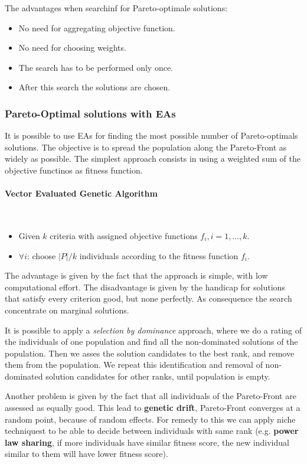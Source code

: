 \documentclass{article}
\begin{document}
The advantages when searchinf for Pareto-optimale solutions:
\begin{itemize}
    \item No need for aggregating objective function.
    \item No need for choosing weights.
    \item The search has to be performed only once.
    \item After this search the solutions are chosen.
\end{itemize}

\subsubsection{Pareto-Optimal solutions with EAs}
It is possible to use EAs for finding the most possible number of Pareto-optimals solutions.
The objective is to spread the population along the Pareto-Front as widely as possible. The
simplest approach consists in using a weighted sum of the objective functinos as fitness function.

\paragraph{Vector Evaluated Genetic Algorithm}\mbox{}\\
\begin{itemize}
    \item Given $k$ criteria with assigned objective functions $f_i, i=1,\dots,k$.
    \item $\forall i$: choose $|P|/k$ individuals according to the fitness function $f_i$.
\end{itemize}
The advantage is given by the fact that the approach is simple, with low computational effort.
The disadvantage is given by the handicap for solutions that satisfy every criterion good,
but none perfectly. As consequence the search concentrate on marginal solutions.

It is possible to apply a \textit{selection by dominance} approach, where we do a rating of the
individuals of one population and find all the non-dominated solutions of the population. Then
we asses the solution candidates to the best rank, and remove them from the population.
We repeat this identification and removal of non-dominated solution candidates for other ranks,
until population is empty.

Another problem is given by the fact that all individuals of the Pareto-Front are assessed as equally
good. This lead to \textbf{genetic drift}, Pareto-Front converges at a random point, because
of random effects. For remedy to this we can apply niche techniquest to be able to decide between
individuals with same rank (e.g. \textbf{power law sharing}, if more individuals have similar
fitness score, the new individual similar to them will have lower fitness score).
\end{document}

